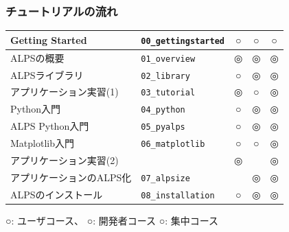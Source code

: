 \begin{frame}
  \frametitle{チュートリアルの流れ}
  \begin{tabular}{|l|l|c|c|c|}
        \hline
        Getting Started & {\tt 00\_gettingstarted} & {\footnotesize\color{red} ○} & {\footnotesize\color{blue} ○} & {\footnotesize\color{green} ○} \\
        \hline
        ALPSの概要 & {\tt 01\_overview} & {\footnotesize\color{red} ◎} & {\footnotesize\color{blue} ◎} & {\footnotesize\color{green} ◎} \\
        \hline
        ALPSライブラリ & {\tt 02\_library} & {\footnotesize\color{red} ○} & {\footnotesize\color{blue} ◎} & {\footnotesize\color{green} ◎} \\
        \hline
        アプリケーション実習(1) & {\tt 03\_tutorial} & {\footnotesize\color{red} ◎} & {\footnotesize\color{blue} ○} & {\footnotesize\color{green} ◎} \\
        \hline
        Python入門 & {\tt 04\_python} & {\footnotesize\color{red} ○} & {\footnotesize\color{blue} ◎} & {\footnotesize\color{green} ◎} \\
        \hline
        ALPS Python入門 & {\tt 05\_pyalps} & {\footnotesize\color{red} ○} & {\footnotesize\color{blue} ◎} & {\footnotesize\color{green} ◎} \\
        \hline
        Matplotlib入門 & {\tt 06\_matplotlib} & {\footnotesize\color{red} ○} & {\footnotesize\color{blue} ○} & {\footnotesize\color{green} ◎} \\
        \hline
        アプリケーション実習(2) & & {\footnotesize\color{red} ◎} & {\footnotesize\color{blue} } & {\footnotesize\color{green} ◎} \\
        \hline
        アプリケーションのALPS化 & {\tt 07\_alpsize} & {\footnotesize\color{red} } & {\footnotesize\color{blue} ◎} & {\footnotesize\color{green} ◎} \\
        \hline
        ALPSのインストール & {\tt 08\_installation} & {\footnotesize\color{red} ○} & {\footnotesize\color{blue} ◎} & {\footnotesize\color{green} ◎} \\
        \hline
  \end{tabular}
  
  {\footnotesize\color{red} ○}: ユーザコース、{\footnotesize\color{blue} ○}: 開発者コース {\footnotesize\color{green} ○}: 集中コース
\end{frame}

